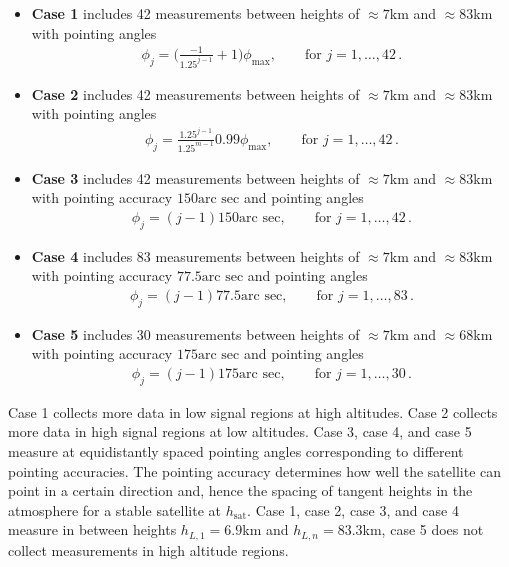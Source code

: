 \begin{itemize}
	\item \textbf{Case 1} includes 42 measurements between heights of $\approx7$km and $\approx83$km with pointing angles
	\begin{align*} 
		\phi_j  = \Bigg(\frac{-1}{1.25^{j-1}} + 1 \Bigg) \phi_{\text{max}} , \qquad  \text{for } j = 1, \dots, 42  \, .
	\end{align*}
	\item \textbf{Case 2} includes 42 measurements between heights of $\approx7$km and $\approx83$km with pointing angles
	\begin{align*} 
		\phi_j  = \frac{1.25 ^{j-1}}{ 1.25 ^{m-1}} 0.99 \phi_{\text{max}},  \qquad  \text{for } j = 1, \dots, 42\, .
	\end{align*}
	\item \textbf{Case 3} includes 42 measurements between heights of $\approx 7$km and $\approx 83$km with pointing accuracy $150 \text{arc sec}$ and pointing angles
	\begin{align*} 
		\phi_j  = (j-1) 150 \text{arc sec} ,  \qquad  \text{for } j = 1, \dots, 42\, .
	\end{align*}
	\item \textbf{Case 4} includes 83 measurements between heights of $\approx 7$km and $\approx83$km with pointing accuracy $77.5 \text{arc sec}$  and pointing angles
	\begin{align*} 
		\phi_j  =   (j-1) 77.5 \text{arc sec} ,  \qquad  \text{for } j = 1, \dots, 83\, .
	\end{align*}
	\item \textbf{Case 5} includes 30 measurements between heights of $\approx 7$km and $\approx 68$km with pointing accuracy $175  \text{arc sec}$ and pointing angles
	\begin{align*} 
		\phi_j  =  (j-1) 175 \text{arc sec} ,  \qquad  \text{for } j = 1, \dots, 30\, .
	\end{align*}
\end{itemize} 
Case 1 collects more data in low signal regions at high altitudes.
Case 2 collects more data in high signal regions at low altitudes.
Case 3, case 4, and case 5 measure at equidistantly spaced pointing angles corresponding to different pointing accuracies.
The pointing accuracy determines how well the satellite can point in a certain direction and, hence the spacing of tangent heights in the atmosphere for a stable satellite at $h_{\text{sat}}$.
Case 1, case 2, case 3, and case 4 measure in between heights $h_{L,1} = 6.9$km and $h_{L,n} = 83.3$km, case 5 does not collect measurements in high altitude regions.
